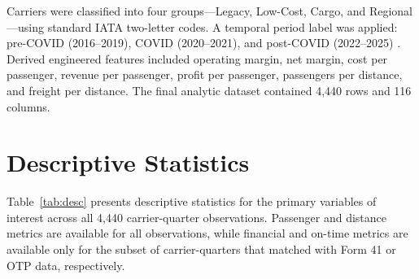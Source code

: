 \documentclass[11pt, letterpaper]{article}
\begin{document}
Carriers were classified into four groups---Legacy, Low-Cost, Cargo, and Regional---using standard IATA two-letter codes. A temporal period label was applied: pre-COVID (2016--2019), COVID (2020--2021), and post-COVID (2022--2025) \cite{fontanet2022}. Derived engineered features included operating margin, net margin, cost per passenger, revenue per passenger, profit per passenger, passengers per distance, and freight per distance. The final analytic dataset contained 4,440 rows and 116 columns.

\section{Descriptive Statistics}

Table~\ref{tab:desc} presents descriptive statistics for the primary variables of interest across all 4,440 carrier-quarter observations. Passenger and distance metrics are available for all observations, while financial and on-time metrics are available only for the subset of carrier-quarters that matched with Form 41 or OTP data, respectively.
\end{document}
